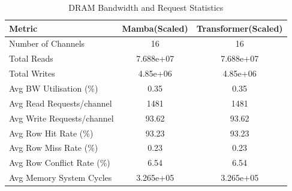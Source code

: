 \begin{table}[h]\centering
    \caption{DRAM Bandwidth and Request Statistics}
    \label{tab:dram_detailed}
    \begin{tabular}{lcc}\hline
    Metric & Mamba(Scaled) & Transformer(Scaled) \\\hline
        Number of Channels & 16 & 16 \\
    Total Reads & 7.688e+07 & 7.688e+07 \\
    Total Writes & 4.85e+06 & 4.85e+06 \\
    Avg BW Utilisation (\%) & 0.35 & 0.35 \\
    Avg Read Requests/channel & 1481 & 1481 \\
    Avg Write Requests/channel & 93.62 & 93.62 \\
    Avg Row Hit Rate (\%) & 93.23 & 93.23 \\
    Avg Row Miss Rate (\%) & 0.23 & 0.23 \\
    Avg Row Conflict Rate (\%) & 6.54 & 6.54 \\
    Avg Memory System Cycles & 3.265e+05 & 3.265e+05 \\
\hline\end{tabular}\end{table}